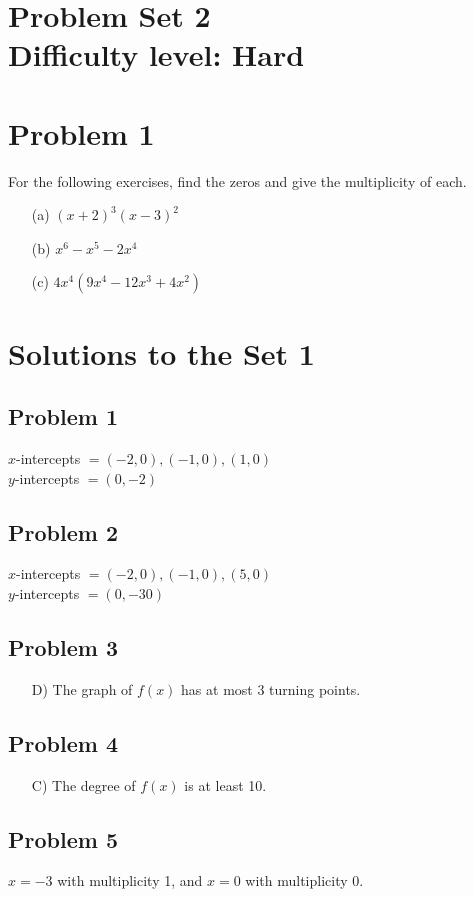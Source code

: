 \documentclass[12pt]{article}
\begin{document}
\section*{Problem Set 2\\Difficulty level: Hard}
\section*{Problem 1}
For the following exercises, find the zeros and give the multiplicity of each.

    \begin{enumerate}
        \item[(a)] \((x+2)^3(x-3)^2\)
        \item[(b)] \(x^6-x^5-2x^4\)
        \item[(c)] \(4x^4(9x^4-12x^3+4x^2)\)
    \end{enumerate}

\newpage
\section*{Solutions to the Set 1}
\subsection*{Problem 1}
\(x\)-intercepts \(= (-2,0),(-1,0),(1,0)\)\\
\(y\)-intercepts \(= (0,-2)\)
\subsection*{Problem 2}
\(x\)-intercepts \(= (-2,0),(-1,0),(5,0)\)\\
\(y\)-intercepts \(= (0,-30)\)
\subsection*{Problem 3}
\begin{enumerate}
    \item[D)] The graph of $f(x)$ has at most 3 turning points.
\end{enumerate}
\subsection*{Problem 4}
\begin{enumerate}
    \item[C)] The degree of $f(x)$ is at least 10.
\end{enumerate}
\subsection*{Problem 5}
\(x=-3\) with multiplicity 1, and \(x=0\) with multiplicity 0.
\end{document}
